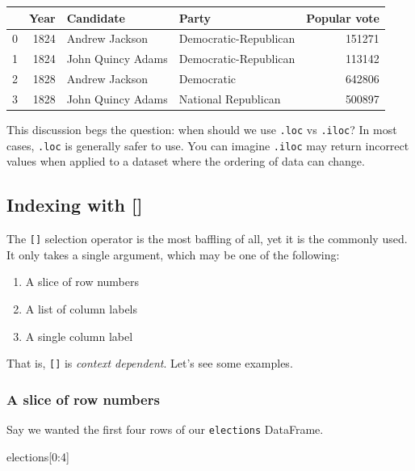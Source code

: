 \documentclass[
  letterpaper,
  DIV=11,
  numbers=noendperiod]{scrreprt}
\newenvironment{Shaded}{\begin{snugshade}}{\end{snugshade}}
\newcommand{\DecValTok}[1]{\textcolor[rgb]{0.68,0.00,0.00}{#1}}
\newcommand{\NormalTok}[1]{\textcolor[rgb]{0.00,0.23,0.31}{#1}}
\providecommand{\tightlist}{%
  \setlength{\itemsep}{0pt}\setlength{\parskip}{0pt}}\usepackage{longtable,booktabs,array}
\begin{document}
\begin{tabular}{lrllr}
\toprule
{} &  Year &          Candidate &                  Party &  Popular vote \\
\midrule
0 &  1824 &     Andrew Jackson &  Democratic-Republican &        151271 \\
1 &  1824 &  John Quincy Adams &  Democratic-Republican &        113142 \\
2 &  1828 &     Andrew Jackson &             Democratic &        642806 \\
3 &  1828 &  John Quincy Adams &    National Republican &        500897 \\
\bottomrule
\end{tabular}

This discussion begs the question: when should we use \texttt{.loc} vs
\texttt{.iloc}? In most cases, \texttt{.loc} is generally safer to use.
You can imagine \texttt{.iloc} may return incorrect values when applied
to a dataset where the ordering of data can change.

\hypertarget{indexing-with}{%
\subsection{Indexing with {[}{]}}\label{indexing-with}}

The \texttt{{[}{]}} selection operator is the most baffling of all, yet
it is the commonly used. It only takes a single argument, which may be
one of the following:

\begin{enumerate}
\def\labelenumi{\arabic{enumi}.}
\tightlist
\item
  A slice of row numbers
\item
  A list of column labels
\item
  A single column label
\end{enumerate}

That is, \texttt{{[}{]}} is \emph{context dependent}. Let's see some
examples.

\hypertarget{a-slice-of-row-numbers}{%
\subsubsection{A slice of row numbers}\label{a-slice-of-row-numbers}}

Say we wanted the first four rows of our \texttt{elections} DataFrame.

\begin{Shaded}
\begin{Highlighting}[]
\NormalTok{elections[}\DecValTok{0}\NormalTok{:}\DecValTok{4}\NormalTok{]}
\end{Highlighting}
\end{Shaded}
\end{document}

